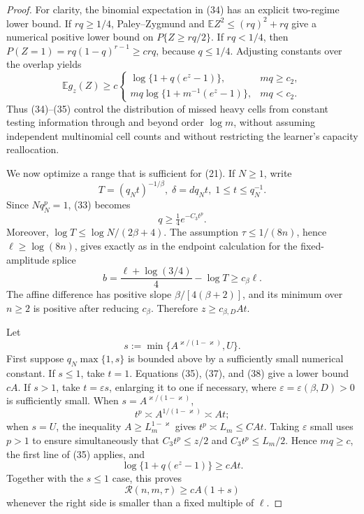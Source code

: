 \documentclass{article}
\begin{document}
\begin{proof}
For clarity, the binomial expectation in (34) has an explicit two-regime lower bound.  If \(rq\geq1/4\), Paley--Zygmund and
\(\mathbb EZ^2\leq(rq)^2+rq\) give a numerical positive lower bound on
\(P\{Z\geq rq/2\}\).  If \(rq<1/4\), then
\(P(Z=1)=rq(1-q)^{r-1}\geq c rq\), because \(q\leq1/4\).  Adjusting constants over the overlap yields
\[
\mathbb E g_z(Z)\geq c\begin{cases}
\log\{1+q(e^z-1)\},&mq\geq c_2,\\
mq\log\{1+m^{-1}(e^z-1)\},&mq<c_2.
\end{cases}                                                         \tag{35}
\]
Thus (34)--(35) control the distribution of missed heavy cells from constant testing information through and beyond order \(\log m\), without assuming independent multinomial cell counts and without restricting the learner's capacity reallocation.

We now optimize a range that is sufficient for (21).  If \(N\geq1\), write
\[
T=(q_Nt)^{-1/\beta},\; \delta=dq_Nt,\;
1\leq t\leq q_N^{-1}.                                                \tag{36}
\]
Since \(Nq_N^p=1\), (33) becomes
\[
q\geq\tfrac14e^{-C_3t^p}.                                           \tag{37}
\]
Moreover, \(\log T\leq\log N/(2\beta+4)\).  The assumption
\(\tau\leq1/(8n)\), hence \(\ell\geq\log(8n)\), gives exactly as in the endpoint calculation for the fixed-amplitude splice
\[
b=\frac{\ell+\log(3/4)}4-\log T\geq c_\beta\ell.                  \tag{38}
\]
The affine difference has positive slope \(\beta/[4(\beta+2)]\), and its minimum over \(n\geq2\) is positive after reducing \(c_\beta\).  Therefore \(z\geq c_{\beta,D}At\).

Let
\[
s:=\min\{A^{\varkappa/(1-\varkappa)},U\}.                          \tag{39}
\]
First suppose \(q_N\max\{1,s\}\) is bounded above by a sufficiently small numerical constant.  If \(s\leq1\), take \(t=1\).  Equations (35), (37), and (38) give a lower bound \(cA\).  If \(s>1\), take \(t=\varepsilon s\), enlarging it to one if necessary, where \(\varepsilon=\varepsilon(\beta,D)>0\) is sufficiently small.  When
\(s=A^{\varkappa/(1-\varkappa)}\),
\[
t^p\asymp A^{1/(1-\varkappa)}\asymp At;
\]
when \(s=U\), the inequality \(A\geq L_m^{1-\varkappa}\) gives
\(t^p\asymp L_m\leq CAt\).  Taking \(\varepsilon\) small uses \(p>1\) to ensure simultaneously that
\(C_3t^p\leq z/2\) and \(C_3t^p\leq L_m/2\).  Hence \(mq\geq c\), the first line of (35) applies, and
\[
\log\{1+q(e^z-1)\}\geq cAt.
\]
Together with the \(s\leq1\) case, this proves
\[
\mathcal R(n,m,\tau)\geq cA(1+s)                                  \tag{40}
\]
whenever the right side is smaller than a fixed multiple of \(\ell\).


\end{proof}
\end{document}
